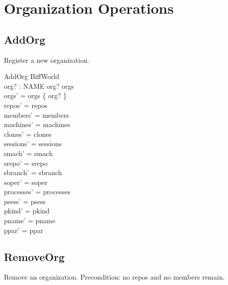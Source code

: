\documentclass[a4paper,10pt,fleqn]{article}
\begin{document}
\section{Organization Operations}

\subsection{AddOrg}

Register a new organization.

\begin{schema}{AddOrg}
  \Delta BiffWorld \\
  org? : NAME
  \where
  org? \notin orgs \\
  orgs' = orgs \cup \{ org? \} \\
  repos' = repos \\
  members' = members \\
  machines' = machines \\
  clones' = clones \\
  sessions' = sessions \\
  smach' = smach \\
  srepo' = srepo \\
  sbranch' = sbranch \\
  soper' = soper \\
  processes' = processes \\
  psess' = psess \\
  pkind' = pkind \\
  pname' = pname \\
  ppar' = ppar
\end{schema}

\subsection{RemoveOrg}

Remove an organization.  Precondition: no repos and no members remain.
\end{document}
